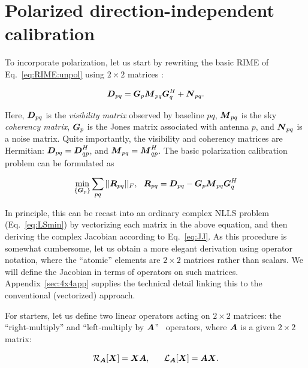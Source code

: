 \documentclass[useAMS,usenatbib]{mn2e}
\newcommand{\mat}[1]{{\bmath{#1}}}
\newcommand{\DD}{\mat{D}}
\newcommand{\MM}{\mat{M}}
\newcommand{\RR}{\mat{R}}
\newcommand{\GG}{\mat{G}}
\begin{document}
\section{Polarized direction-independent calibration}
\label{sec:pol:DI}

To incorporate polarization, let us start by rewriting the basic RIME of Eq.~\ref{eq:RIME:unpol} using $2\times 2$ matrices \citep[a full derivation
may be found in][]{RRIME1}:

\begin{equation}
\label{eq:RIME:pol}
\DD_{pq} = \GG_p \MM_{pq} \GG^H_q + \mat{N}_{pq}.
\end{equation}

Here, $\DD_{pq}$ is the \emph{visibility matrix} observed by baseline $pq$, $\MM_{pq}$ is the sky \emph{coherency matrix}, $\GG_p$ is the Jones matrix associated with antenna $p$, and $\mat{N}_{pq}$ is a noise matrix. Quite importantly, the visibility and coherency matrices are Hermitian: 
$\DD_{pq}=\DD^H_{qp}$, and $\MM_{pq}=\MM^H_{qp}$. The basic polarization calibration problem can be formulated as

\begin{equation}
\label{eq:cal:DI:pol}
\min_{\{\GG_p\}}\sum_{pq}||\RR_{pq}||_F,~~
\RR_{pq} = \DD_{pq}-\GG_p \MM_{pq} \GG^H_q
\end{equation}


\newcommand{\Rop}[1]{\mathcal{R}_{{#1}}}
\newcommand{\Lop}[1]{\mathcal{L}_{{#1}}}
\newcommand{\Top}{\mathcal{T}}

In principle, this can be recast into an ordinary complex NLLS problem (Eq.~\ref{eq:LSmin}) by vectorizing each matrix in the above equation, 
and then deriving the complex Jacobian according to Eq.~\ref{eq:JJ}. As this procedure is somewhat cumbersome, let us obtain a 
more elegant derivation using operator notation, where the ``atomic'' elements are $2\times2$ matrices rather than scalars. We will define the Jacobian in terms of operators on such matrices. Appendix~\ref{sec:4x4app} supplies the technical detail linking this to the 
conventional (vectorized) approach. 

For starters, let us define two linear operators acting on $2\times2$ matrices: the ``right-multiply'' and ``left-multiply by $\mat{A}$'' \
operators, where $\mat{A}$ is a given $2\times2$ matrix:

\begin{equation}
\label{eq:def:RL}
\Rop{\mat{A}} [\mat{X}] = \mat{XA}, ~~~~~
\Lop{\mat{A}} [\mat{X}] = \mat{AX}.
\end{equation}
\end{document}
